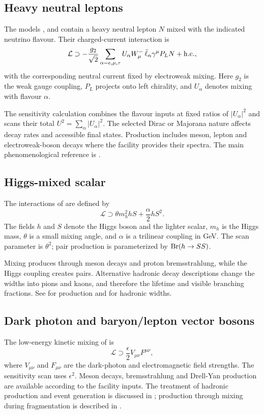\subsection{Heavy neutral leptons}
The models ,  and  contain a heavy neutral lepton $N$ mixed with the indicated neutrino flavour. Their charged-current interaction is
\begin{equation}
 \mathcal L\supset-\frac{g_2}{\sqrt{2}}\sum_{\alpha=e,\mu,\tau}
 U_\alpha W^-_\mu\,\bar\ell_\alpha\gamma^\mu P_LN+\mathrm{h.c.},
\end{equation}
with the corresponding neutral current fixed by electroweak mixing. Here $g_2$ is the weak gauge coupling, $P_L$ projects onto left chirality, and $U_\alpha$ denotes mixing with flavour $\alpha$.

The sensitivity calculation combines the flavour inputs at fixed ratios of $|U_\alpha|^2$ and scans their total $U^2=\sum_\alpha|U_\alpha|^2$. The selected Dirac or Majorana nature affects decay rates and accessible final states. Production includes meson, lepton and electroweak-boson decays where the facility provides their spectra. The main phenomenological reference is .

\subsection{Higgs-mixed scalar}
The interactions of  are defined by
\begin{equation}
 \mathcal L\supset\theta m_h^2hS+\frac{\alpha}{2}hS^2.
\end{equation}
The fields $h$ and $S$ denote the Higgs boson and the lighter scalar, $m_h$ is the Higgs mass, $\theta$ is a small mixing angle, and $\alpha$ is a trilinear coupling in GeV. The scan parameter is $\theta^2$; pair production is parameterized by $\operatorname{Br}(h\to SS)$.

Mixing produces  through meson decays and proton bremsstrahlung, while the Higgs coupling creates pairs. Alternative hadronic decay descriptions change the widths into pions and kaons, and therefore the lifetime and visible branching fractions. See  for production and  for hadronic widths.

\subsection{Dark photon and baryon/lepton vector bosons}
The low-energy kinetic mixing of  is
\begin{equation}
 \mathcal L\supset\frac{\epsilon}{2}V_{\mu\nu}F^{\mu\nu},
\end{equation}
where $V_{\mu\nu}$ and $F_{\mu\nu}$ are the dark-photon and electromagnetic field strengths. The sensitivity scan uses $\epsilon^2$. Meson decays, bremsstrahlung and Drell-Yan production are available according to the facility inputs. The treatment of hadronic production and event generation is discussed in ; production through mixing during fragmentation is described in .

